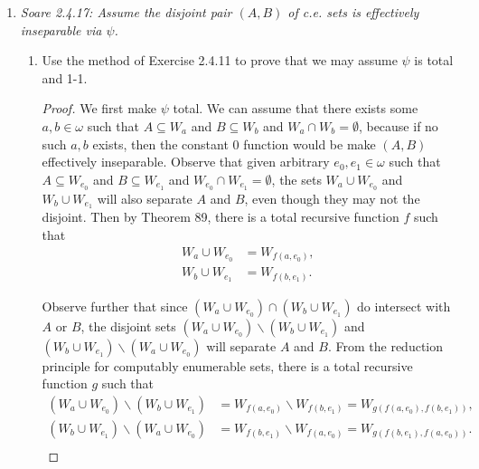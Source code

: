 \documentclass{article}
\begin{document}
\begin{enumerate}[label={\bf Q\arabic*:}]
\begin{proof}
      Once again, we can construct $g$ via the SMN theorem, by first
      constructing another function $\varphi_{g(e)}(x)$ that outputs
      0 if $x\in\text{range}(\varphi_e)$ and that does not halt otherwise.
    \end{proof}

  \item \it Soare 2.4.17: Assume the disjoint pair $(A,B)$ of c.e. sets is
    effectively inseparable via $\psi$.
    \begin{enumerate}[label={(\roman*)}]
      \item Use the method of Exercise 2.4.11 to prove that we may assume
        $\psi$ is total and 1-1.

        \begin{proof}
          We first make $\psi$ total. We can assume that there exists some
          $a,b\in\omega$ such that $A\subseteq W_a$ and $B\subseteq W_b$
          and $W_a\cap W_b=\emptyset$, because if no such $a,b$ exists,
          then the constant 0 function would be make $(A,B)$ effectively
          inseparable. Observe that given arbitrary $e_0,e_1\in\omega$ such
          that $A\subseteq W_{e_0}$ and $B\subseteq W_{e_1}$ and
          $W_{e_0}\cap W_{e_1}=\emptyset$, the sets $W_a\cup W_{e_0}$ and
          $W_b\cup W_{e_1}$ will also separate $A$ and $B$, even though
          they may not the disjoint. Then by Theorem 89, there is a total
          recursive function $f$ such that
          \begin{align*}
            W_a\cup W_{e_0} &=W_{f(a,e_0)},\\
            W_b\cup W_{e_1} &=W_{f(b,e_1)}.
          \end{align*}

          Observe further that since $(W_a\cup W_{e_0})\cap (W_b\cup
          W_{e_1})$ do intersect with $A$ or $B$, the disjoint sets
          $(W_a\cup W_{e_0})\backslash(W_b\cup W_{e_1})$ and $(W_b\cup
          W_{e_1})\backslash(W_a\cup W_{e_0})$ will separate $A$ and $B$.
          From the reduction principle for computably enumerable sets,
          there is a total recursive function $g$ such that
          \begin{align*}
            (W_a\cup W_{e_0})\backslash(W_b\cup W_{e_1})
              &=W_{f(a,e_0)}\backslash W_{f(b,e_1)}
              =W_{g(f(a,e_0),f(b,e_1))},\\
            (W_b\cup W_{e_1})\backslash(W_a\cup W_{e_0})
              &=W_{f(b,e_1)}\backslash W_{f(a,e_0)}
              =W_{g(f(b,e_1),f(a,e_0))}.\\
          \end{align*}


\end{proof}
\end{enumerate}
\end{enumerate}
\end{document}
